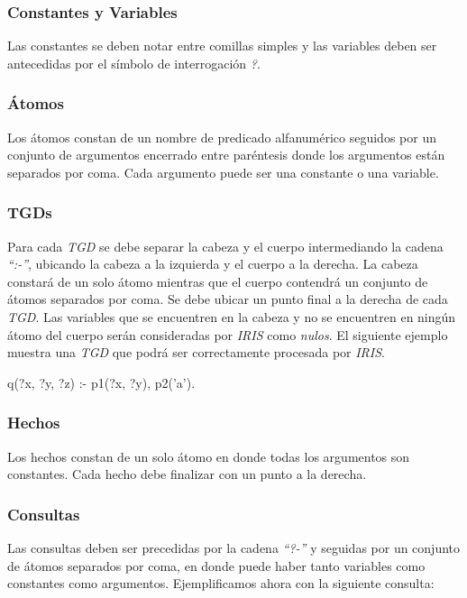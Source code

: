 \documentclass[11pt,a4paper,twoside]{tesis}
\begin{document}
\subsubsection{Constantes y Variables}
Las constantes se deben notar entre comillas simples y las variables deben ser antecedidas por el símbolo de interrogación \textit{?}.

\subsubsection{Átomos}
Los átomos constan de un nombre de predicado alfanumérico seguidos por un conjunto de argumentos encerrado entre paréntesis donde los argumentos están separados por coma. Cada argumento puede ser una constante o una variable.

\subsubsection{TGDs}
Para cada \textit{TGD} se debe separar la cabeza y el cuerpo intermediando la cadena \textit{``:-''}, ubicando la cabeza a la izquierda y el cuerpo a la derecha. La cabeza constará de un solo átomo mientras que el cuerpo contendrá un conjunto de átomos separados por coma. Se debe ubicar un punto final a la derecha de cada \textit{TGD}. Las variables que se encuentren en la cabeza y no se encuentren en ningún átomo del cuerpo serán consideradas por \textit{IRIS} como \textit{nulos}.   El siguiente ejemplo muestra una \textit{TGD} que podrá ser correctamente procesada por \textit{IRIS}.

\begin{center}
    q(?x, ?y, ?z) :- p1(?x, ?y), p2('a').
\end{center} 

\subsubsection{Hechos}
Los hechos constan de un solo átomo en donde todas los argumentos son constantes. Cada hecho debe finalizar con un punto a la derecha.

\subsubsection{Consultas}\label{consultas_iris}
Las consultas deben ser precedidas por la cadena \textit{``?-''} y seguidas por un conjunto de átomos separados por coma, en donde puede haber tanto variables como constantes como argumentos. Ejemplificamos ahora con la siguiente consulta:
\end{document}
